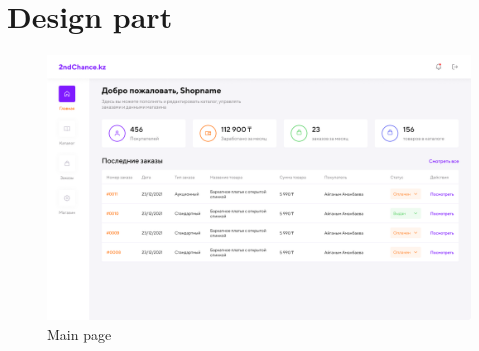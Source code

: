 \chapter{Design part}\label{app:A}

\begin{figure}[h!]
    \centering
    \includegraphics[scale=0.3]{figures/Main page.png}
    \caption{Main page}
    \label{fig:main-page}
\end{figure}

